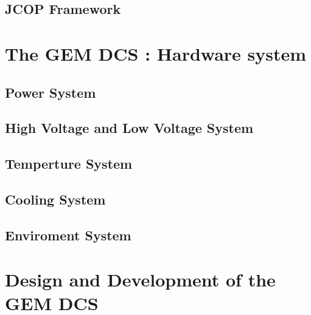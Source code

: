 
\smallskip
\subsection{JCOP Framework}


\smallskip
\section{The GEM DCS : Hardware system}

\smallskip
\subsection{Power System}


\smallskip
\subsection{High Voltage and Low Voltage System}

\smallskip
\subsection{Temperture System}


\smallskip
\subsection{Cooling System}

\smallskip
\subsection{Enviroment System}



\smallskip
\section{Design and Development of the GEM DCS}

